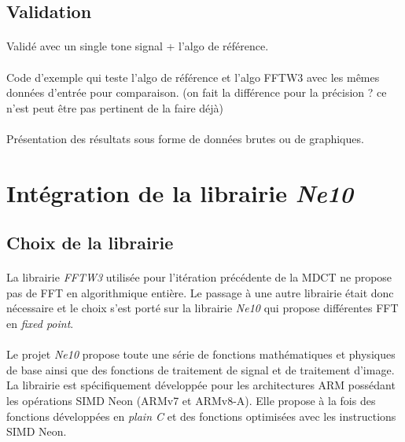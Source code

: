 \documentclass{article}
\begin{document}

    \subsection{Validation}
    \paragraph{}
    Validé avec un single tone signal + l'algo de référence.

    \paragraph{}
    Code d'exemple qui teste l'algo de référence et l'algo FFTW3 avec les mêmes données d'entrée pour comparaison. (on fait la différence pour la précision ? ce n'est peut être pas pertinent de la faire déjà)

    \paragraph{}
    Présentation des résultats sous forme de données brutes ou de graphiques.


    \newpage
    \section{Intégration de la librairie \emph{Ne10}}
    \subsection{Choix de la librairie}
    \paragraph{}
    La librairie \emph{FFTW3} utilisée pour l'itération précédente de la MDCT ne propose pas de FFT en algorithmique entière. Le passage à une autre librairie était donc nécessaire et le choix s'est porté sur la librairie \emph{Ne10} qui propose différentes FFT en \emph{fixed point}.

    \paragraph{}
    Le projet \emph{Ne10} propose toute une série de fonctions mathématiques et physiques de base ainsi que des fonctions de traitement de signal et de traitement d'image. La librairie est spécifiquement développée pour les architectures ARM possédant les opérations SIMD Neon (ARMv7 et ARMv8-A)\cite{Ne10}. Elle propose à la fois des fonctions développées en \emph{plain C} et des fonctions optimisées avec les instructions SIMD Neon.
\end{document}
